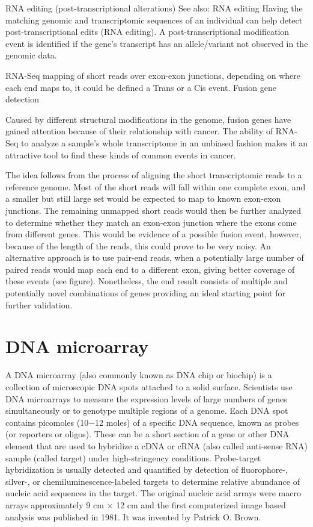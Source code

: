 RNA editing (post-transcriptional alterations)
See also: RNA editing
Having the matching genomic and transcriptomic sequences of an individual can help detect post-transcriptional edits (RNA editing). A post-transcriptional modification event is identified if the gene's transcript has an allele/variant not observed in the genomic data.

RNA-Seq mapping of short reads over exon-exon junctions, depending on where each end maps to, it could be defined a Trans or a Cis event.
Fusion gene detection

Caused by different structural modifications in the genome, fusion genes have gained attention because of their relationship with cancer. The ability of RNA-Seq to analyze a sample's whole transcriptome in an unbiased fashion makes it an attractive tool to find these kinds of common events in cancer.

The idea follows from the process of aligning the short transcriptomic reads to a reference genome. Most of the short reads will fall within one complete exon, and a smaller but still large set would be expected to map to known exon-exon junctions. The remaining unmapped short reads would then be further analyzed to determine whether they match an exon-exon junction where the exons come from different genes. This would be evidence of a possible fusion event, however, because of the length of the reads, this could prove to be very noisy. An alternative approach is to use pair-end reads, when a potentially large number of paired reads would map each end to a different exon, giving better coverage of these events (see figure). Nonetheless, the end result consists of multiple and potentially novel combinations of genes providing an ideal starting point for further validation.

\hypertarget{dna-microarray}{%
\section{DNA microarray}\label{dna-microarray}}

A DNA microarray (also commonly known as DNA chip or biochip) is a collection of microscopic DNA spots attached to a solid surface. Scientists use DNA microarrays to measure the expression levels of large numbers of genes simultaneously or to genotype multiple regions of a genome. Each DNA spot contains picomoles (10−12 moles) of a specific DNA sequence, known as probes (or reporters or oligos). These can be a short section of a gene or other DNA element that are used to hybridize a cDNA or cRNA (also called anti-sense RNA) sample (called target) under high-stringency conditions. Probe-target hybridization is usually detected and quantified by detection of fluorophore-, silver-, or chemiluminescence-labeled targets to determine relative abundance of nucleic acid sequences in the target. The original nucleic acid arrays were macro arrays approximately 9 cm × 12 cm and the first computerized image based analysis was published in 1981. It was invented by Patrick O. Brown.

